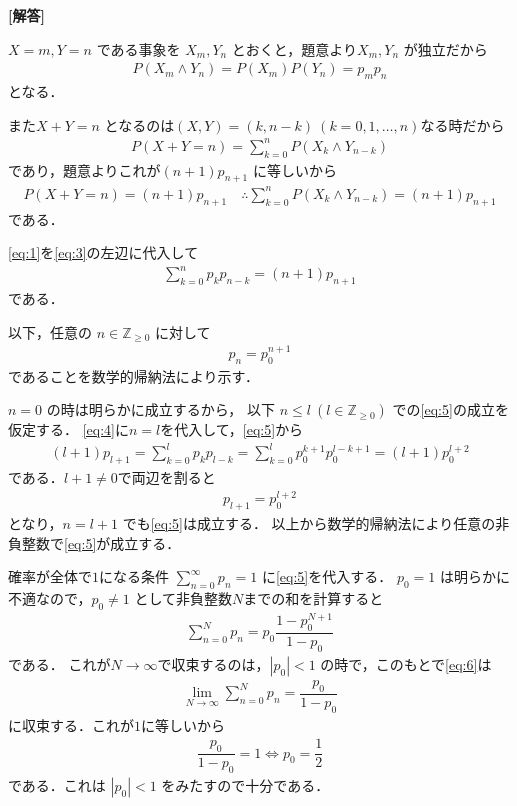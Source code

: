 \documentclass[../../main.tex]{subfiles}
\begin{document}
\begin{oframed}
  
\end{oframed}

{\bf [解答]}

$X=m, Y=n$ である事象を $X_m, Y_n$ とおくと，題意より$X_m, Y_n$ が独立だから
\begin{align}
  P(X_m \wedge Y_n) = P(X_m) P(Y_n) = p_mp_n \label{eq:1}
\end{align}
となる．

また$X+Y=n$ となるのは$(X, Y) = (k, n-k) \ (k=0, 1, \dots, n)$なる時だから
\begin{align}
  P(X+Y=n) = \sum_{k=0}^n P(X_k \wedge Y_{n-k}) \label{eq:2}
\end{align}
であり，題意よりこれが$(n+1) p_{n+1}$ に等しいから
\begin{align}
  P(X+Y=n) = (n+1) p_{n+1} \quad \therefore \sum_{k=0}^n P(X_k \wedge Y_{n-k}) = (n+1) p_{n+1} \label{eq:3}
\end{align}
である．

\cref{eq:1}を\cref{eq:3}の左辺に代入して
\begin{align}
  \sum_{k=0}^n p_k p_{n-k} = (n+1) p_{n+1} \label{eq:4}
\end{align}
である．

以下，任意の $n \in \mathbb{Z}_{\ge 0}$ に対して
\begin{align}
  p_n = p_0^{n+1} \label{eq:5}
\end{align}
であることを数学的帰納法により示す．

$n=0$ の時は明らかに成立するから，
以下 $n \le l \ (l \in \mathbb{Z}_{\ge 0})$ での\cref{eq:5}の成立を仮定する．
\cref{eq:4}に$n=l$を代入して，\cref{eq:5}から
\begin{align}
  (l+1) p_{l+1}
  = \sum_{k=0}^{l} p_k p_{l-k}
  = \sum_{k=0}^l p_0^{k+1} p_0^{l-k+1}
  = (l+1) p_0^{l+2}
\end{align}
である．$l+1 \neq 0$で両辺を割ると
\begin{align}
  p_{l+1} = p_0^{l+2}
\end{align}
となり，$n=l+1$ でも\cref{eq:5}は成立する．
以上から数学的帰納法により任意の非負整数で\cref{eq:5}が成立する．

確率が全体で$1$になる条件 $\sum_{n=0}^\infty p_n = 1$ に\cref{eq:5}を代入する．
$p_0 = 1$ は明らかに不適なので，$p_0 \neq 1$ として非負整数$N$までの和を計算すると
\begin{align}
  \sum_{n=0}^N p_n = p_0 \dfrac{1 - p_0^{N+1}}{1 - p_0} \label{eq:6}
\end{align}
である．
これが$N\to\infty$で収束するのは，$|p_0| < 1$ の時で，このもとで\cref{eq:6}は
\begin{align}
  \lim_{N\to\infty} \sum_{n=0}^N p_n = \dfrac{p_0}{1-p_0}
\end{align}
に収束する．これが$1$に等しいから
\begin{align}
  \dfrac{p_0}{1-p_0} = 1 \iff p_0 = \dfrac{1}{2}
\end{align}
である．これは $|p_0| < 1$ をみたすので十分である．
\end{document}
